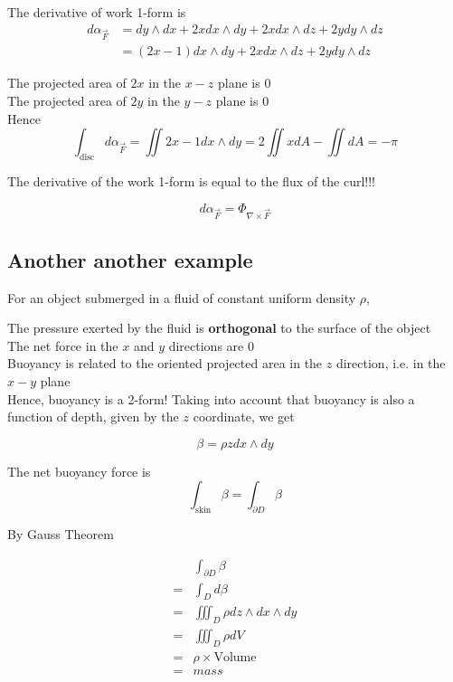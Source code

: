 The derivative of work 1-form is
\begin{align*}
   d\alpha_{\vec{F}} &= dy \wedge dx + 2x dx \wedge dy + 2x dx \wedge dz + 2y dy \wedge dz \\
                     &= (2x -1) dx \wedge dy + 2x dx \wedge dz + 2y dy \wedge dz
\end{align*}

The projected area of $2x$ in the $x-z$ plane is 0 \\

The projected area of $2y$ in the $y-z$ plane is 0 \\

Hence
\[
   \int_{\text{disc}}^{}  d \alpha_{\vec{F}} = \iint 2x - 1 dx \wedge dy = 2 \iint x dA - \iint dA = -\pi 
\] 

The derivative of the work 1-form is equal to the flux of the curl!!!

\[
   d\alpha_{\vec{F}} = \Phi_{\nabla \times \vec{F}}
\] 

\subsection{Another another example}

For an object submerged in a fluid of constant uniform density $\rho$,

The pressure exerted by the fluid is  \textbf{orthogonal} to the surface of the object \\

The net force in the $x$ and $y$ directions are 0 \\

Buoyancy is related to the oriented projected area in the $z$ direction, i.e. in the $x-y$ plane \\

Hence, buoyancy is a 2-form! Taking into account that buoyancy is also a function of depth, given by the $z$ coordinate, we get

\[
  \beta = \rho z dx \wedge dy
\] 

The net buoyancy force is 
\[
   \int_{\text{skin}}^{}  \beta = \int_{\partial D}^{}  \beta 
\] 

By Gauss Theorem

\begin{align*}
   &\int_{\partial D}^{}  \beta  \\
   =& \int_{D}^{} d\beta \\
   =& \iiint_{D} \rho dz\wedge dx \wedge dy   \\
   =& \iiint_{D} \rho dV \\
   =& \rho \times \text{Volume}  \\
   =& mass
\end{align*} 

